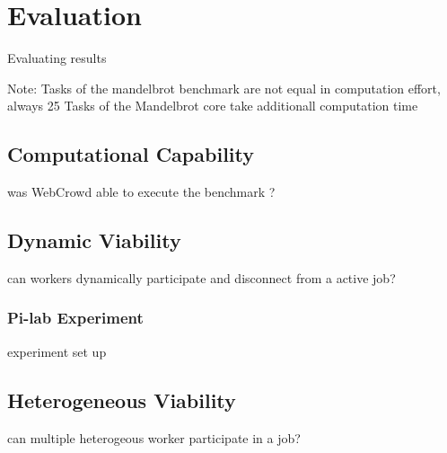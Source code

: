 \chapter{Evaluation}
\label{ch:evaluation}
Evaluating results

Note: Tasks of the mandelbrot benchmark are not equal in computation effort, always 25 Tasks of the Mandelbrot core take additionall computation time

\section{Computational Capability}
\label{sec:evaluation:benchmark}
was WebCrowd able to execute the benchmark ?

\section{Dynamic Viability}
\label{sec:evaluation:workers}
can workers dynamically participate and disconnect from a active job?

\subsection{Pi-lab Experiment}
experiment set up

\section{Heterogeneous Viability}
\label{sec:evaluation:batch}
can multiple heterogeous worker participate in a job?